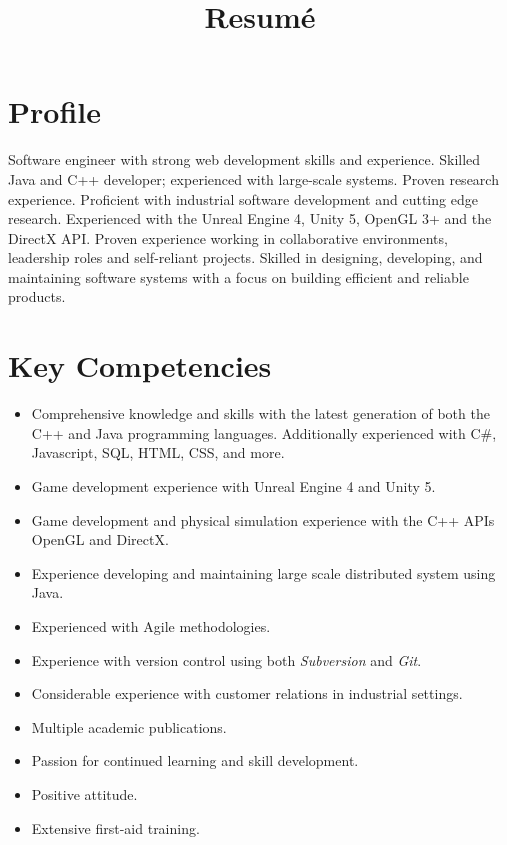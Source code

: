 \documentclass[11pt,a4paper,sans]{moderncv}        %
\title{Resumé}                               %
\begin{document}
\makecvtitle
\section{Profile}
Software engineer with strong web development skills and experience.
Skilled Java and C++ developer; experienced with large-scale systems.
Proven research experience. 
Proficient with industrial software development and cutting edge research.
Experienced with the Unreal Engine 4, Unity 5, OpenGL 3+ and the DirectX API.
Proven experience working in collaborative environments, leadership roles and self-reliant projects.
Skilled in designing, developing, and maintaining software systems with a focus on building efficient and reliable products.
\section{Key Competencies}
\begin{itemize}
	\item Comprehensive knowledge and skills with the latest generation of both the C++ and Java programming languages. Additionally experienced with C\#, Javascript, SQL, HTML, CSS, and more.
	\item Game development experience with Unreal Engine 4 and Unity 5.
	\item Game development and physical simulation experience with the C++ APIs OpenGL and DirectX.
	\item Experience developing and maintaining large scale distributed system using Java.
	\item Experienced with Agile methodologies.
	\item Experience with version control using both \textit{Subversion} and \textit{Git}.
	\item Considerable experience with customer relations in industrial settings.
	\item Multiple academic publications.
	\item Passion for continued learning and skill development.
	\item Positive attitude.
	\item Extensive first-aid training.
\end{itemize}
\end{document}
